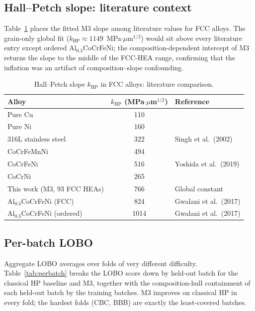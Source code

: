 \documentclass[11pt]{article}
\begin{document}
\subsection{Hall--Petch slope: literature context}
Table~\ref{tab:khp_lit} places the fitted M3 slope among literature values for FCC alloys. The grain-only global fit ($k_\text{HP} \approx 1149$~MPa$\cdot\mu$m$^{1/2}$) would sit above every literature entry except ordered Al$_{0.3}$CoCrFeNi; the composition-dependent intercept of M3 returns the slope to the middle of the FCC-HEA range, confirming that the inflation was an artifact of composition--slope confounding.

\begin{table}[htb]
\centering
\caption{Hall--Petch slope $k_\text{HP}$ in FCC alloys: literature comparison.}
\label{tab:khp_lit}
\small
\begin{tabular}{lcl}
\toprule
Alloy & $k_\text{HP}$ (MPa$\cdot\mu$m$^{1/2}$) & Reference \\
\midrule
Pure Cu                       & 110  & \cite{Cordero2016} \\
Pure Ni                       & 160  & \cite{Cordero2016} \\
316L stainless steel          & 322  & Singh et al.\ (2002) \\
CoCrFeMnNi                    & 494  & \cite{Otto2013} \\
CoCrFeNi                      & 516  & Yoshida et al.\ (2019) \\
CoCrNi                        & 265  & \cite{Yoshida2017} \\
This work (M3, 93 FCC HEAs)   & 766  & Global constant \\
Al$_{0.3}$CoCrFeNi (FCC)      & 824  & Gwalani et al.\ (2017) \\
Al$_{0.3}$CoCrFeNi (ordered)  & 1014 & Gwalani et al.\ (2017) \\
\bottomrule
\end{tabular}
\end{table}

\subsection{Per-batch LOBO}
Aggregate LOBO averages over folds of very different difficulty. Table~\ref{tab:perbatch} breaks the LOBO score down by held-out batch for the classical HP baseline and M3, together with the composition-hull containment of each held-out batch by the training batches. M3 improves on classical HP in every fold; the hardest folds (CBC, BBB) are exactly the least-covered batches.
\end{document}
